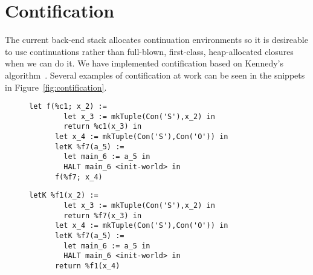 \documentclass{article}
\begin{document}
\section{Contification}
\label{sec:contification}
The current back-end stack allocates continuation environments so it is desireable to use continuations rather than full-blown, first-class, heap-allocated closures when we can do it. We have implemented contification based on Kennedy's algorithm~\cite{kennedy07cps}. Several examples of contification at work can be seen in the snippets in Figure~\ref{fig:contification}.
\begin{figure}[htb]
\centering
\begin{minipage}{0.4\textwidth}
   \begin{lstlisting}[gobble=6,caption={Before contification}]
      let f(%c1; x_2) := 
        let x_3 := mkTuple(Con('S'),x_2) in
        return %c1(x_3) in
      let x_4 := mkTuple(Con('S'),Con('O')) in
      letK %f7(a_5) := 
        let main_6 := a_5 in
        HALT main_6 <init-world> in
      f(%f7; x_4)
    \end{lstlisting}
\end{minipage}
\begin{minipage}{0.1\textwidth}
\end{minipage}
\begin{minipage}{0.4\textwidth}
    \begin{lstlisting}[gobble=6,caption={After contification}]
      letK %f1(x_2) := 
        let x_3 := mkTuple(Con('S'),x_2) in
        return %f7(x_3) in
      let x_4 := mkTuple(Con('S'),Con('O')) in
      letK %f7(a_5) := 
        let main_6 := a_5 in
        HALT main_6 <init-world> in
      return %f1(x_4)
    \end{lstlisting}
\end{minipage}



\end{figure}
\end{document}
